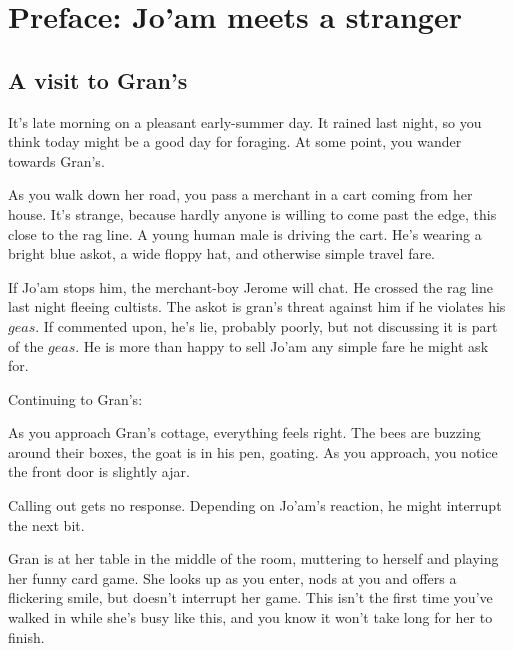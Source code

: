 \section{Preface: Jo'am meets a stranger}\label{sec:joamMeetsAStranger}

\begin{multicols}{2}
  \subsection{A visit to Gran's}
  \begin{aloud}
  It's late morning on a pleasant early-summer day.
  It rained last night, so you think today might be a good day for foraging.
  At some point, you wander towards Gran's.

  As you walk down her road, you pass a merchant in a cart coming from her house.
  It's strange, because hardly anyone is willing to come past the edge, this close to the rag line.
  A young human male is driving the cart.
  He's wearing a bright blue askot, a wide floppy hat, and otherwise simple travel fare.
  \end{aloud}

If Jo'am stops him, the merchant-boy Jerome will chat.
He crossed the rag line last night fleeing cultists.
The askot is gran's threat against him if he violates his $geas$.
If commented upon, he's lie, probably poorly, but not discussing it is part of the $geas$.
He is more than happy to sell Jo'am any simple fare he might ask for.

Continuing to Gran's:

  \begin{aloud}
  As you approach Gran's cottage, everything feels right.
  The bees are buzzing around their boxes, the goat is in his pen, goating.
  As you approach, you notice the front door is slightly ajar.
  \end{aloud}

Calling out gets no response.
Depending on Jo'am's reaction, he might interrupt the next bit.

  \begin{aloud}
  Gran is at her table in the middle of the room, muttering to herself and playing her
    funny card game.
  She looks up as you enter, nods at you and offers a flickering smile, but doesn't interrupt
    her game.
  This isn't the first time you've walked in while she's busy like this, and you know it won't
    take long for her to finish.
  \end{aloud}


\end{multicols}
